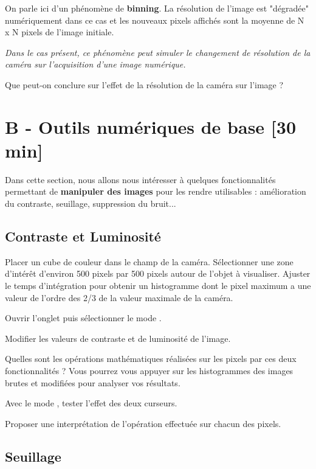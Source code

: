 On parle ici d'un phénomène de \textbf{binning}. La résolution de l'image est "dégradée" numériquement dans ce cas et les nouveaux pixels affichés sont la moyenne de N x N pixels de l'image initiale.

\textit{Dans le cas présent, ce phénomène peut simuler le changement de résolution de la caméra sur l'acquisition d'une image numérique.}

\Quest Que peut-on conclure sur l'effet de la résolution de la caméra sur l'image ?


\section{B - Outils numériques de base {[30 min]}}

Dans cette section, nous allons nous intéresser à quelques fonctionnalités permettant de \textbf{manipuler des images} pour les rendre utilisables : amélioration du contraste, seuillage, suppression du bruit...

\subsection{Contraste et Luminosité}

\Manip Placer un cube de couleur dans le champ de la caméra. Sélectionner une zone d'intérêt d'environ 500 pixels par 500 pixels autour de l'objet à visualiser. Ajuster le temps d'intégration pour obtenir un histogramme dont le pixel maximum a une valeur de l'ordre des 2/3 de la valeur maximale de la caméra. 

\Manip Ouvrir l'onglet  puis sélectionner le mode .

\Manip Modifier les valeurs de contraste et de luminosité de l'image.

\Quest Quelles sont les opérations mathématiques réalisées sur les pixels par ces deux fonctionnalités ? Vous pourrez vous appuyer sur les histogrammes des images brutes et modifiées pour analyser vos résultats.

\Manip Avec le mode , tester l'effet des deux curseurs.

\Quest Proposer une interprétation de l'opération effectuée sur chacun des pixels.


\subsection{Seuillage}

